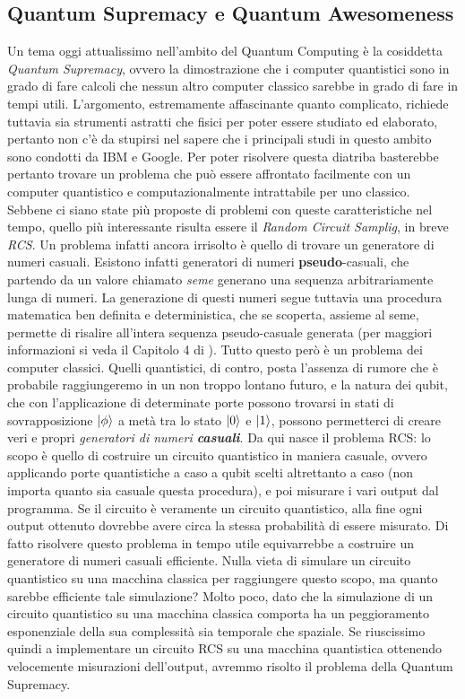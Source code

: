 \documentclass{book}
\theoremstyle{definition}
\theoremstyle{definition}
\theoremstyle{definition}
\theoremstyle{plain}
\theoremstyle{plain}
\theoremstyle{plain}
\theoremstyle{plain}
\begin{document}
\subsection{Quantum Supremacy e Quantum Awesomeness}
Un tema oggi attualissimo nell'ambito del Quantum Computing è la cosiddetta \emph{Quantum Supremacy}, ovvero la dimostrazione che i computer quantistici sono in grado di fare calcoli che nessun altro computer classico sarebbe in grado di fare in tempi utili\cite{wiki:Quantum_supremacy}. L'argomento, estremamente affascinante quanto complicato, richiede tuttavia sia strumenti astratti che fisici per poter essere studiato ed elaborato, pertanto non c'è da stupirsi nel sapere che i principali studi in questo ambito sono condotti da IBM e Google. Per poter risolvere questa diatriba basterebbe pertanto trovare un problema che può essere affrontato facilmente con un computer quantistico e computazionalmente intrattabile per uno classico. Sebbene ci siano state più proposte di problemi con queste caratteristiche nel tempo, quello più interessante risulta essere il \emph{Random Circuit Samplig}, in breve \emph{RCS}. Un problema infatti ancora irrisolto è quello di trovare un generatore di numeri casuali. Esistono infatti generatori di numeri \textbf{pseudo}-casuali, che partendo da un valore chiamato \emph{seme} generano una sequenza arbitrariamente lunga di numeri. La generazione di questi numeri segue tuttavia una procedura matematica ben definita e deterministica, che se scoperta, assieme al seme, permette di risalire all'intera sequenza pseudo-casuale generata (per maggiori informazioni si veda il Capitolo 4 di \cite{elementi_di_crittografia}). Tutto questo però è un problema dei computer classici. Quelli quantistici, di contro, posta l'assenza di rumore che è probabile raggiungeremo in un non troppo lontano futuro, e la natura dei qubit, che con l'applicazione di determinate porte possono trovarsi in stati di sovrapposizione $\ket{\phi}$ a metà tra lo stato $\ket{0}$ e $\ket{1}$, possono permetterci di creare veri e propri \emph{generatori di numeri \textbf{casuali}}. Da qui nasce il problema RCS: lo scopo è quello di costruire un circuito quantistico in maniera casuale, ovvero applicando porte quantistiche a caso a qubit scelti altrettanto a caso (non importa quanto sia casuale questa procedura), e poi misurare i vari output dal programma. Se il circuito è veramente un circuito quantistico, alla fine ogni output ottenuto dovrebbe avere circa la stessa probabilità di essere misurato. Di fatto risolvere questo problema in tempo utile equivarrebbe a costruire un generatore di numeri casuali efficiente. Nulla vieta di simulare un circuito quantistico su una macchina classica per raggiungere questo scopo, ma quanto sarebbe efficiente tale simulazione? Molto poco, dato che la simulazione di un circuito quantistico su una macchina classica comporta ha un peggioramento esponenziale della sua complessità sia temporale che spaziale. Se riuscissimo quindi a implementare un circuito RCS su una macchina quantistica ottenendo velocemente misurazioni dell'output, avremmo risolto il problema della Quantum Supremacy.
\end{document}

